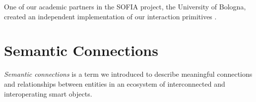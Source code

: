  
% 


One of our academic partners in the \ac{SOFIA} project, the University of Bologna, created an independent implementation of our interaction primitives \cite{Bartolini2011}. %



\section{Semantic Connections}



\emph{Semantic connections} is a term we introduced \cite{VanderVlist2010,VanderVlist2010a} to describe meaningful connections and relationships between entities in an ecosystem of interconnected and interoperating smart objects. 

